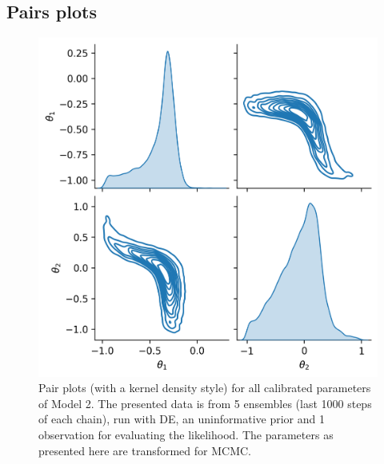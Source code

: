\subsection{Pairs plots}\label{sub_pairsplots}


\begin{figure}[ht]
\centering
\includegraphics[width=1.0\linewidth]{Figures/appendix_figs/kde_model2_DE.png}
\caption{Pair plots (with a kernel density style) for all calibrated parameters of Model 2. The presented data is from 5 ensembles (last 1000 steps of each chain), run with DE, an uninformative prior and 1 observation for evaluating the likelihood. The parameters as presented here are transformed for MCMC.}\label{fig_kde_model2_DE}
\end{figure}


